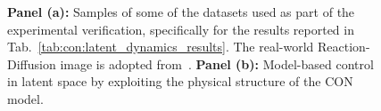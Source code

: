 \begin{figure}[t]
    \centering
    \hfill
    \caption{\textbf{Panel (a):} Samples of some of the datasets used as part of the experimental verification, specifically for the results reported in Tab.~\ref{tab:con:latent_dynamics_results}. The real-world Reaction-Diffusion image is adopted from~\citep{epstein2016reaction}. \textbf{Panel (b):} Model-based control in latent space by exploiting the physical structure of the CON model.}
\end{figure}

